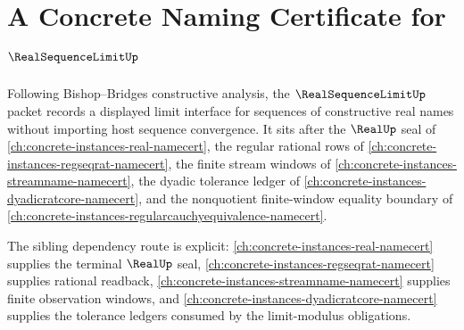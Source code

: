 \chapter{A Concrete Naming Certificate for $\RealSequenceLimitUp$}
\label{ch:concrete-instances-real-sequence-limit-namecert}

Following Bishop--Bridges constructive analysis, the $\RealSequenceLimitUp$ packet records a displayed limit interface for sequences of constructive real names without importing host sequence convergence. It sits after the $\RealUp$ seal of \autoref{ch:concrete-instances-real-namecert}, the regular rational rows of \autoref{ch:concrete-instances-regseqrat-namecert}, the finite stream windows of \autoref{ch:concrete-instances-streamname-namecert}, the dyadic tolerance ledger of \autoref{ch:concrete-instances-dyadicratcore-namecert}, and the nonquotient finite-window equality boundary of \autoref{ch:concrete-instances-regularcauchyequivalence-namecert}.

The sibling dependency route is explicit: \autoref{ch:concrete-instances-real-namecert} supplies the terminal $\RealUp$ seal, \autoref{ch:concrete-instances-regseqrat-namecert} supplies rational readback, \autoref{ch:concrete-instances-streamname-namecert} supplies finite observation windows, and \autoref{ch:concrete-instances-dyadicratcore-namecert} supplies the tolerance ledgers consumed by the limit-modulus obligations.

